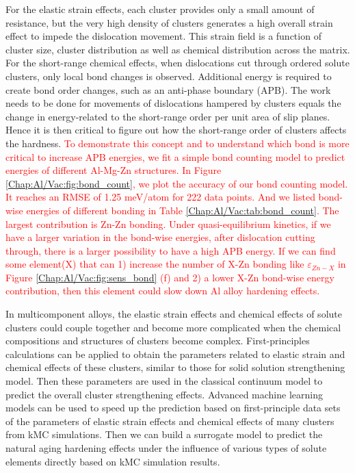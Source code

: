 For the elastic strain effects, each cluster provides only a small amount of resistance, but the very high density of clusters generates a high overall strain effect to impede the dislocation movement. This strain field is a function of cluster size, cluster distribution as well as chemical distribution across the matrix. For the short-range chemical effects, when dislocations cut through ordered solute clusters, only local bond changes is observed. Additional energy is required to create bond order changes, such as an anti-phase boundary (APB). The work needs to be done for movements of dislocations hampered by clusters equals the change in energy-related to the short-range order per unit area of slip planes. Hence it is then critical to figure out how the short-range order of clusters affects the hardness. \textcolor{red}{To demonstrate this concept and to understand which bond is more critical to increase APB energies, we fit a simple bond counting model to predict energies of different Al-Mg-Zn structures. In Figure \ref{Chap:Al/Vac:fig:bond_count}, we plot the accuracy of our bond counting model. It reaches an RMSE of 1.25 meV/atom for 222 data points. And we listed bond-wise energies of different bonding in Table \ref{Chap:Al/Vac:tab:bond_count}. The largest contribution is Zn-Zn bonding. Under quasi-equilibrium kinetics, if we have a larger variation in the bond-wise energies, after dislocation cutting through, there is a larger possibility to have a high APB energy. If we can find some element(X) that can 1) increase the number of X-Zn bonding like $\varepsilon_{Zn-X}$ in Figure \ref{Chap:Al/Vac:fig:sens_bond} (f) and 2) a lower X-Zn bond-wise energy contribution, then this element could slow down Al alloy hardening effects.}


In multicomponent alloys, the elastic strain effects and chemical effects of solute clusters could couple together and become more complicated when the chemical compositions and structures of clusters become complex. First-principles calculations can be applied to obtain the parameters related to elastic strain and chemical effects of these clusters, similar to those for solid solution strengthening model\cite{yasi2010first}.  Then these parameters are used in the classical continuum model to predict the overall cluster strengthening effects. Advanced machine learning models can be used to speed up the prediction based on first-principle data sets of the parameters of elastic strain effects and chemical effects of many clusters from \ac{kMC} simulations. Then we can build a surrogate model to predict the natural aging hardening effects under the influence of various types of solute elements directly based on \ac{kMC} simulation results.